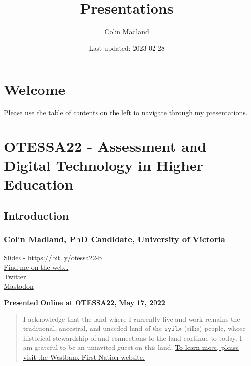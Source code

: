 \documentclass[
]{book}
\title{Presentations}
\author{Colin Madland}
\date{Last updated: 2023-02-28}
\begin{document}
\maketitle

{
\setcounter{tocdepth}{1}
\tableofcontents
}
\hypertarget{welcome}{%
\chapter*{Welcome}\label{welcome}}

Please use the table of contents on the left to navigate through my presentations.

\hypertarget{otessa22---assessment-and-digital-technology-in-higher-education}{%
\chapter*{OTESSA22 - Assessment and Digital Technology in Higher Education}\label{otessa22---assessment-and-digital-technology-in-higher-education}}

\hypertarget{introduction}{%
\section*{Introduction}\label{introduction}}

\hypertarget{colin-madland-phd-candidate-university-of-victoria}{%
\subsection*{Colin Madland, PhD Candidate, University of Victoria}\label{colin-madland-phd-candidate-university-of-victoria}}

Slides - \url{https://bit.ly/otessa22-b}\\
\href{https://cmad.land}{Find me on the web\ldots{}}\\
\href{https://twitter.com/colinmadland}{Twitter}\\
\href{https://scholar.social/web/@Cmadland}{Mastodon}

\textbf{Presented Online at OTESSA22, May 17, 2022}

\begin{quote}
I acknowledge that the land where I currently live and work remains the traditional, ancestral, and unceded land of the \texttt{syilx} (silks) people, whose historical stewardship of and connections to the land continue to today. I am grateful to be an uninvited guest on this land. \href{https://wfn.ca}{To learn more, please visit the Westbank First Nation website.}
\end{quote}
\end{document}
